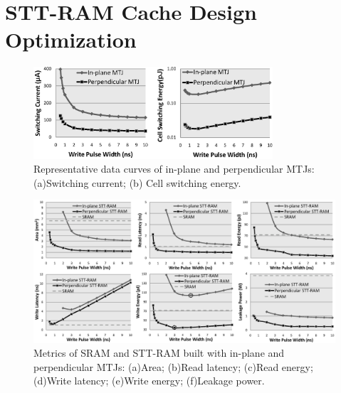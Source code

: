 \section{STT-RAM Cache Design Optimization} \label{sec:opt}

\begin{figure}[t]
  \centering
  \includegraphics[width=3.5in]{fig/MTJSpec.eps}
  \caption{Representative data curves of in-plane and perpendicular MTJs: (a)Switching current; (b) Cell switching energy.}
  \label{fig:metrics}
\end{figure}

\begin{figure}[t]
  \centering
  \includegraphics[width=7in]{fig/AllMetrics.eps}
  \caption{Metrics of SRAM and STT-RAM built with in-plane and perpendicular MTJs: (a)Area; (b)Read latency; (c)Read energy; (d)Write latency; (e)Write energy; (f)Leakage power.}
  \label{fig:metrics}
\end{figure}